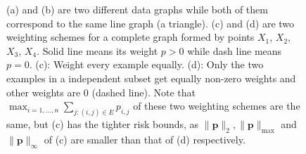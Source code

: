\documentclass[letterpaper]{article} %
\def\SingleColumnEnd{}
\newcommand{\probdistri}{\mathbf{p}}
\newcommand{\pair}[1]{(#1)}
\begin{document}
\begin{figure}[h]
{    }\hspace{11ex}
    \hspace{5ex}
  \SingleColumnEnd
    \caption{(a) and (b) are two different data graphs while both of them correspond to the same line graph (a triangle). (c) and (d) are two weighting schemes for a complete graph formed by points $X_1$, $X_2$, $X_3$, $X_4$. Solid line means its weight $p>0$ while dash line means $p=0$. (c): Weight every example equally. (d): Only the two examples in a independent subset get equally non-zero weights and other weights are $0$ (dashed line). Note that $\max_{i=1,\dots,n} \sum_{j:\pair{i,j}\in E} p_{i,j}$ of these two weighting schemes are the same, but (c) has the tighter risk bounds, as $\|\probdistri{}\|_2, \|\probdistri{}\|_\max$ and $\|\probdistri{}\|_\infty$ of (c) are smaller than that of (d) respectively.}
    \label{fig:weighting_scheme_complete_graph}
\end{figure}

\end{document}
